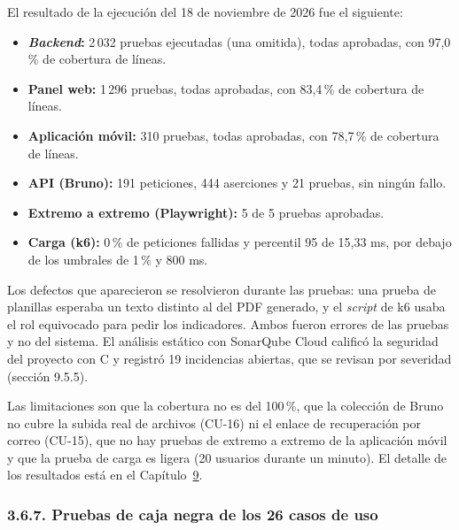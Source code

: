 El resultado de la ejecución del 18 de noviembre de 2026 fue el siguiente:

\begin{itemize}
    \item \textbf{\textit{Backend}:} 2\,032 pruebas ejecutadas (una omitida), todas aprobadas, con 97,0\,\% de cobertura de líneas.
    \item \textbf{Panel web:} 1\,296 pruebas, todas aprobadas, con 83,4\,\% de cobertura de líneas.
    \item \textbf{Aplicación móvil:} 310 pruebas, todas aprobadas, con 78,7\,\% de cobertura de líneas.
    \item \textbf{API (Bruno):} 191 peticiones, 444 aserciones y 21 pruebas, sin ningún fallo.
    \item \textbf{Extremo a extremo (Playwright):} 5 de 5 pruebas aprobadas.
    \item \textbf{Carga (k6):} 0\,\% de peticiones fallidas y percentil 95 de 15,33 ms, por debajo de los umbrales de 1\,\% y 800 ms.
\end{itemize}

Los defectos que aparecieron se resolvieron durante las pruebas: una prueba de planillas esperaba un texto distinto al del PDF generado, y el \textit{script} de k6 usaba el rol equivocado para pedir los indicadores. Ambos fueron errores de las pruebas y no del sistema. El análisis estático con SonarQube Cloud calificó la seguridad del proyecto con C y registró 19 incidencias abiertas, que se revisan por severidad (sección 9.5.5).

Las limitaciones son que la cobertura no es del 100\,\%, que la colección de Bruno no cubre la subida real de archivos (CU-16) ni el enlace de recuperación por correo (CU-15), que no hay pruebas de extremo a extremo de la aplicación móvil y que la prueba de carga es ligera (20 usuarios durante un minuto). El detalle de los resultados está en el Capítulo~\hyperref[cap:pruebas]{9}.

\subsubsection{3.6.7. Pruebas de caja negra de los 26 casos de uso}

